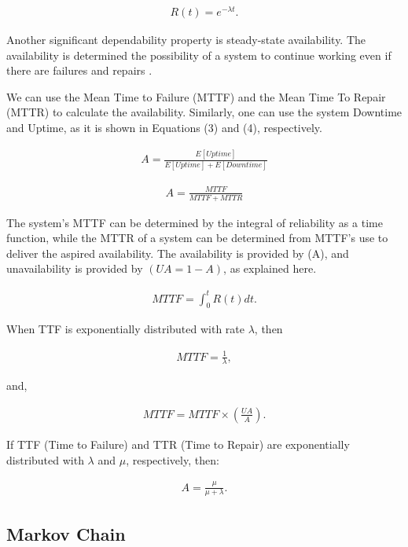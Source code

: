 \documentclass[conference]{IEEEtran}
\begin{document}
\begin{align}
R(t) = e^{- \lambda t}.
\end{align}
 
Another significant dependability property is steady-state availability. The availability is determined the possibility of a system to continue working even if there are failures and repairs \citep{trivedi2008probability}.

We can use the Mean Time to Failure (MTTF) and the Mean Time To Repair (MTTR) to calculate the availability. Similarly, one can use the system Downtime and Uptime, as it is shown in Equations (3) and (4), respectively.

\begin{align}
A = \frac{E[Uptime]}{E[Uptime] + E[Downtime]}
\end{align}

\begin{align}
A = \frac{MTTF}{MTTF + MTTR}
\end{align}

The system's MTTF can be determined by the integral of reliability as a time function, while the MTTR of a system can be determined from MTTF's use to deliver the aspired availability. The availability is provided by (A), and unavailability is provided by $(UA= 1-A)$, as explained here.

\begin{align}
MTTF = \int_{0}^{t} R(t)dt.
\end{align}

When TTF is exponentially distributed with rate $\lambda$, then

\begin{align}
MTTF = \frac{1}{\lambda},
\end{align}

and,

\begin{align}
MTTF = MTTF \times (\frac{UA}{A}).
\end{align}

If TTF (Time to Failure) and TTR (Time to Repair) are exponentially distributed with $\lambda$ and $\mu$, respectively, then:

\begin{align}
A = \frac{\mu}{\mu + \lambda}.
\end{align}

\subsection{Markov Chain}
\end{document}
